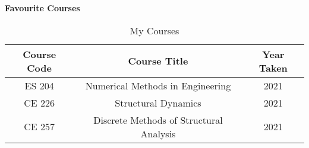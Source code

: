 \documentclass[12pt,a4paper]{article}
\begin{document}
\noindent \textbf{Favourite Courses}
\begin{table} [htb]
  \begin{center}
    \caption{My Courses}
    {\begin{tabular} [t] {ccc}
        \hline
        \textbf{Course Code} & \textbf{Course Title}                   & \textbf{Year Taken} \\
        \hline
        ES 204               & Numerical Methods in Engineering        & 2021                \\
        CE 226               & Structural Dynamics                     & 2021                \\
        CE 257               & Discrete Methods of Structural Analysis & 2021                \\
      \end{tabular}}
  \end{center}
\end{table}

\newpage
\end{document}
